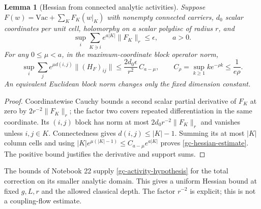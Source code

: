 \documentclass[11pt]{article}
\newtheorem{lemma}[theorem]{Lemma}
\theoremstyle{remark}
\begin{document}
\begin{lemma}[Hessian from connected analytic activities]
\label{gc-hessian-bound}
Suppose $F(w)=\mathrm{Vac}+\sum_K F_K(w|_K)$ with nonempty connected
carriers, $d_0$ scalar coordinates per unit cell, holomorphy on a
scalar polydisc of radius $r$, and
\begin{equation}\label{gc-activity-hypothesis}
 \sup_i\sum_{K\ni i} e^{a|K|}\|F_K\|_r\le\epsilon,\qquad a>0.
\end{equation}
For any $0\le\mu<a$, in the maximum-coordinate block operator norm,
\begin{equation}\label{gc-hessian-estimate}
 \sup_i\sum_j e^{\mu d(i,j)}\|(H_F)_{ij}\|
 \le \frac{2d_0\epsilon}{r^2}\,
          C_{a-\mu},\qquad
 C_\rho=\sup_{k\ge1}k e^{-\rho k}\le\frac1{e\rho}.
\end{equation}
An equivalent Euclidean block norm changes only the fixed
dimension constant.
\end{lemma}
\begin{proof}
Coordinatewise Cauchy bounds a second scalar partial derivative
of $F_K$ at zero by $2r^{-2}\|F_K\|_r$; the factor two covers
repeated differentiation in the same coordinate. Its $(i,j)$
block has norm at most $2d_0r^{-2}\|F_K\|_r$ and vanishes unless
$i,j\in K$. Connectedness gives $d(i,j)\le |K|-1$.
Summing its at most $|K|$ column cells and using
$|K|e^{\mu(|K|-1)}\le C_{a-\mu}e^{a|K|}$
proves \eqref{gc-hessian-estimate}. The positive bound justifies
the derivative and support sums.
\end{proof}

The bounds of Notebook 22 supply \eqref{gc-activity-hypothesis}
for the total correction on its smaller analytic domain.
This gives a uniform Hessian bound at fixed $g,L,r$ and the
allowed classical depth. The factor $r^{-2}$ is explicit;
this is not a coupling-flow estimate.
\end{document}
